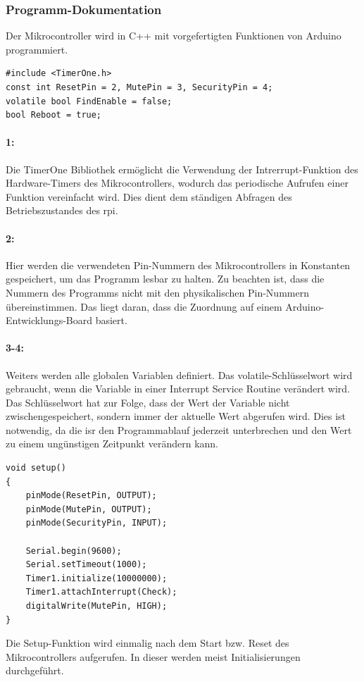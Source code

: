 \subsubsection{Programm-Dokumentation}
Der Mikrocontroller wird in C++ mit vorgefertigten Funktionen von Arduino programmiert.

\begin{verbatim}
#include <TimerOne.h>
const int ResetPin = 2, MutePin = 3, SecurityPin = 4;
volatile bool FindEnable = false;
bool Reboot = true;
\end{verbatim}
\paragraph{1:}
Die TimerOne Bibliothek ermöglicht die Verwendung der Intrerrupt-Funktion des Hardware-Timers des Mikrocontrollers, wodurch das periodische Aufrufen einer Funktion vereinfacht wird.
Dies dient dem ständigen Abfragen des Betriebszustandes des \ac{rpi}.

\paragraph{2:}
Hier werden die verwendeten Pin-Nummern des Mikrocontrollers in Konstanten gespeichert, um das Programm lesbar zu halten.
Zu beachten ist, dass die Nummern des Programms nicht mit den physikalischen Pin-Nummern übereinstimmen.
Das liegt daran, dass die Zuordnung auf einem Arduino-Entwicklungs-Board basiert.

\paragraph{3-4:}
Weiters werden alle globalen Variablen definiert.
Das volatile-Schlüsselwort wird gebraucht, wenn die Variable in einer Interrupt Service Routine verändert wird.
Das Schlüsselwort hat zur Folge, dass der Wert der Variable nicht zwischengespeichert, sondern immer der aktuelle Wert abgerufen wird.
Dies ist notwendig, da die \ac{isr} den Programmablauf jederzeit unterbrechen und den Wert zu einem ungünstigen Zeitpunkt verändern kann.

\begin{verbatim}
void setup()
{
    pinMode(ResetPin, OUTPUT);
    pinMode(MutePin, OUTPUT);
    pinMode(SecurityPin, INPUT);
    
    Serial.begin(9600);
    Serial.setTimeout(1000);
    Timer1.initialize(10000000);
    Timer1.attachInterrupt(Check);
    digitalWrite(MutePin, HIGH);
}
\end{verbatim}
Die Setup-Funktion wird einmalig nach dem Start bzw. Reset des Mikrocontrollers aufgerufen. In dieser werden meist Initialisierungen durchgeführt.

